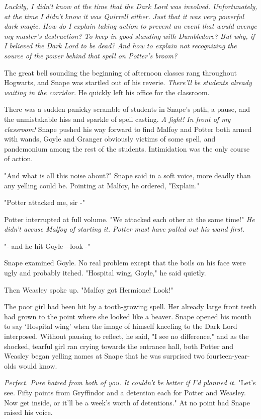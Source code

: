 \emph{Luckily, I didn't know at the time that the Dark Lord was involved. Unfortunately, at the time I didn't know it was Quirrell either. Just that it was very powerful dark magic. How do I explain taking action to prevent an event that would avenge my master's destruction? To keep in good standing with Dumbledore? But why, if I believed the Dark Lord to be dead? And how to explain not recognizing the source of the power behind that spell on Potter's broom?}

The great bell sounding the beginning of afternoon classes rang throughout Hogwarts, and Snape was startled out of his reverie. \emph{There'll be students already waiting in the corridor.} He quickly left his office for the classroom.

There was a sudden panicky scramble of students in Snape's path, a pause, and the unmistakable hiss and sparkle of spell casting. \emph{A fight! In front of my classroom!} Snape pushed his way forward to find Malfoy and Potter both armed with wands, Goyle and Granger obviously victims of some spell, and pandemonium among the rest of the students. Intimidation was the only course of action.

"And what is all this noise about?" Snape said in a soft voice, more deadly than any yelling could be. Pointing at Malfoy, he ordered, "Explain."

"Potter attacked me, sir -"

Potter interrupted at full volume. "We attacked each other at the same time!" \emph{He didn't accuse Malfoy of starting it. Potter must have pulled out his wand first.}

"- and he hit Goyle—look -"

Snape examined Goyle. No real problem except that the boils on his face were ugly and probably itched. "Hospital wing, Goyle," he said quietly.

Then Weasley spoke up. "Malfoy got Hermione! Look!"

The poor girl had been hit by a tooth-growing spell. Her already large front teeth had grown to the point where she looked like a beaver. Snape opened his mouth to say `Hospital wing' when the image of himself kneeling to the Dark Lord interposed. Without pausing to reflect, he said, "I see no difference," and as the shocked, tearful girl ran crying towards the entrance hall, both Potter and Weasley began yelling names at Snape that he was surprised two fourteen-year-olds would know.

\emph{Perfect. Pure hatred from both of you. It couldn't be better if I'd planned it.} "Let's see. Fifty points from Gryffindor and a detention each for Potter and Weasley. Now get inside, or it'll be a week's worth of detentions." At no point had Snape raised his voice.

